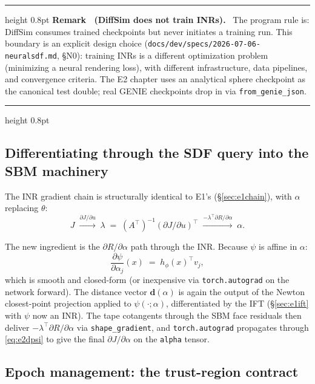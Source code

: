 \documentclass[11pt]{article}
\newcounter{remark}
\newenvironment{remark}[1]{%
  \refstepcounter{remark}\par\medskip
  \noindent\begin{minipage}{\linewidth}
  \hrule height 0.8pt \smallskip
  \textbf{Remark \theremark\ (#1).}\ }{%
  \smallskip\hrule height 0.8pt \end{minipage}\par\medskip}
\begin{document}
\begin{remark}{DiffSim does not train INRs}
The program rule is: DiffSim consumes trained checkpoints but never
initiates a training run.  This boundary is an explicit design choice
(\texttt{docs/dev/specs/2026-07-06-neuralsdf.md}, \S N0): training INRs
is a different optimization problem (minimizing a neural rendering loss),
with different infrastructure, data pipelines, and convergence criteria.
The E2 chapter uses an analytical sphere checkpoint as the canonical test
double; real GENIE checkpoints drop in via \texttt{from\_genie\_json}.
\end{remark}

\subsection{Differentiating through the SDF query into the SBM machinery}
\label{sec:e2diffchain}

The INR gradient chain is structurally identical to E1's
(\S\ref{sec:e1chain}), with $\alpha$ replacing $\theta$:
\begin{equation}
  J
  \;\xrightarrow{\partial J/\partial u}\;
  \lambda \;=\; (A^\top)^{-1}(\partial J/\partial u)^\top
  \;\xrightarrow{-\lambda^\top \partial R/\partial \alpha}\;
  \alpha .
  \label{eq:e2chain}
\end{equation}

The new ingredient is the $\partial R/\partial \alpha$ path through the INR.
Because $\psi$ is affine in $\alpha$:
\begin{equation}
  \frac{\partial \psi}{\partial \alpha_j}(x)
  \;=\; h_\phi(x)^\top v_j,
  \label{eq:e2dpsi}
\end{equation}
which is smooth and closed-form (or inexpensive via \texttt{torch.autograd}
on the network forward).  The distance vector $\mathbf{d}(\alpha)$ is again
the output of the Newton closest-point projection applied to $\psi(\cdot;
\alpha)$, differentiated by the IFT (\S\ref{sec:e1ift} with $\psi$ now an
INR).  The tape cotangents through the SBM face residuals then deliver
$-\lambda^\top \partial R/\partial \alpha$ via \texttt{shape\_gradient},
and \texttt{torch.autograd} propagates through \eqref{eq:e2dpsi} to give
the final $\partial J/\partial \alpha$ on the \texttt{alpha} tensor.

\subsection{Epoch management: the trust-region contract}
\label{sec:e2epoch}
\end{document}
